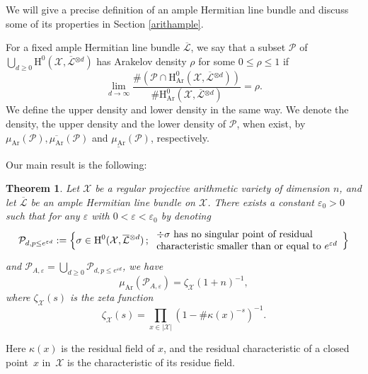 \documentclass[JEP,XML,SOM,Unicode,published]{cedram}
\let\epsilon\varepsilon
\newcommand{\sep}{\,;\,}
\theoremstyle{plain}
\newtheorem{thm}{Theorem}[section]
\theoremstyle{definition}
\newcommand{\ho}{\mathrm{H}}
\newcommand{\X}{\mathcal{X}}
\newcommand{\Li}{\overline{\mathcal{L}}{}}
\begin{document}
We will give a precise definition of an ample Hermitian line bundle and discuss some of its properties in Section \ref{arithample}.

For a fixed ample Hermitian line bundle $\Li$, we say that a subset $\mathcal{P}$ of $\bigcup_{d\geq 0}\ho^0(\X, \Li^{\otimes d})$ has Arakelov density $\rho$ for some $0\leq \rho\leq 1$ if
\[
\lim_{d\to \infty} \frac{ \#\left(\mathcal{P}\cap \ho_{\mathrm{Ar}}^0(\X, \Li^{\otimes d})\right) }{\#\ho_{\mathrm{Ar}}^0(\X, \Li^{\otimes d})}=\rho.
\]
We define the upper density and lower density in the same way. We denote the density, the upper density and the lower density of $\mathcal{P}$, when exist, by $\mu_{\mathrm{Ar}}(\mathcal{P}),\overline{\mu_{\mathrm{Ar}}}(\mathcal{P})$ and $\underline{\mu_{\mathrm{Ar}}}(\mathcal{P})$, respectively.

Our main result is the following:

\begin{thm}\label{mainvar}
Let $\X$ be a regular projective arithmetic variety of dimension $n$, and let $\Li$ be an ample Hermitian line bundle on $\X$.
There exists a constant $\epsilon_0>0$ such that for any $\varepsilon$ with $0<\varepsilon<\epsilon_0$ by denoting
\[
\mathcal{P}_{d,p\leq e^{\varepsilon d}}:=\Bigl\{ \sigma\in \ho^0(\X,\Li^{\otimes d})\sep \begin{array}{ll}
\div \sigma \text{ has no singular point of residual} \\
\text{characteristic smaller than or equal to } e^{\varepsilon d}
\end{array}\Bigr\}
\]
and $\mathcal{P}_{A,\varepsilon}=\bigcup_{d\geq 0} \mathcal{P}_{d,p\leq e^{\varepsilon d}}$, we have
\[
\mu_{\mathrm{Ar}}(\mathcal{P}_{A,\varepsilon})=\zeta_{\X}(1+n)^{-1},
\]
where $\zeta_{\X}(s)$ is the zeta function
\[
\zeta_{\X}(s)= \prod_{x\in |\X|}(1-\#\kappa(x)^{-s})^{-1}.
\]
\end{thm}
Here $\kappa(x)$ is the residual field of $x$, and the residual characteristic of a closed point~$x$ in~$\X$ is the characteristic of its residue field.
\end{document}
